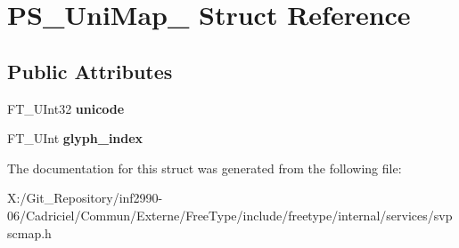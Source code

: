 \hypertarget{struct_p_s___uni_map__}{\section{P\-S\-\_\-\-Uni\-Map\-\_\- Struct Reference}
\label{struct_p_s___uni_map__}
}
\subsection*{Public Attributes}
\begin{DoxyCompactItemize}
\item 
\hypertarget{struct_p_s___uni_map___a87c1f471eb4033fc5ed9d0f1ecaf35a1}{F\-T\-\_\-\-U\-Int32 {\bfseries unicode}}\label{struct_p_s___uni_map___a87c1f471eb4033fc5ed9d0f1ecaf35a1}

\item 
\hypertarget{struct_p_s___uni_map___a0d5b2e3c405aeab1f1059a3587125cfd}{F\-T\-\_\-\-U\-Int {\bfseries glyph\-\_\-index}}\label{struct_p_s___uni_map___a0d5b2e3c405aeab1f1059a3587125cfd}

\end{DoxyCompactItemize}


The documentation for this struct was generated from the following file\-:\begin{DoxyCompactItemize}
\item 
X\-:/\-Git\-\_\-\-Repository/inf2990-\/06/\-Cadriciel/\-Commun/\-Externe/\-Free\-Type/include/freetype/internal/services/svpscmap.\-h\end{DoxyCompactItemize}
